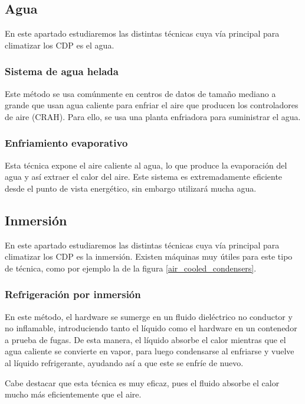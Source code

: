 \subsection{Agua} \label{awa}

En este apartado estudiaremos las distintas técnicas cuya vía principal para climatizar los CDP es el agua.

\subsubsection{Sistema de agua helada}

Este método se usa comúnmente en centros de datos de tamaño mediano a grande que usan agua caliente para enfriar el aire que producen los controladores de aire (CRAH). Para ello, se usa una planta enfriadora para suministrar el agua.

\subsubsection{Enfriamiento evaporativo}

Esta técnica expone el aire caliente al agua, lo que produce la evaporación del agua y así extraer el calor del aire. Este sistema es extremadamente eficiente desde el punto de vista energético, sin embargo utilizará mucha agua.

\subsection{Inmersión} \label{inmersion}

En este apartado estudiaremos las distintas técnicas cuya vía principal para climatizar los CDP es la inmersión. Existen máquinas muy útiles para este tipo de técnica, como por ejemplo la de la figura \eqref{air_cooled_condensers}.

\subsubsection{Refrigeración por inmersión}

En este método, el hardware se sumerge en un fluido dieléctrico no conductor y no inflamable, introduciendo tanto el líquido como el hardware en un contenedor a prueba de fugas. De esta manera, el líquido absorbe el calor mientras que el agua caliente se convierte en vapor, para luego condensarse al enfriarse y vuelve al líquido refrigerante, ayudando así a que este se enfríe de nuevo.

Cabe destacar que esta técnica es muy eficaz, pues el fluido absorbe el calor mucho más eficientemente que el aire.

